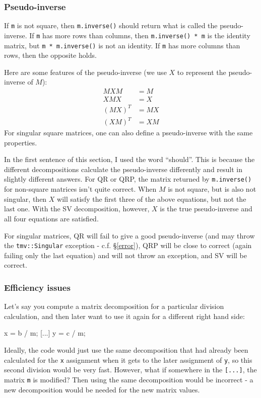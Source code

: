 \documentclass[twoside,letterpaper,11pt]{article}
\renewcommand{\tt}[1]{{\lstinline {#1}}}
\begin{document}
\subsubsection{Pseudo-inverse}
\label{pseudoinverse}

If \tt{m} is not square, then \tt{m.inverse()} should return what is called the pseudo-inverse.
If \tt{m} has more rows than columns, then \tt{m.inverse() * m} is the identity matrix, 
but \tt{m * m.inverse()}
is not an identity.  If \tt{m} has more columns than rows, then the opposite holds.

Here are some features of the pseudo-inverse (we use $X$ to represent the pseudo-inverse
of $M$):
\begin{align*}
M X M &= M \\
X M X &= X \\
(M X)^T &= M X \\
(X M)^T &= X M 
\end{align*}
For singular square matrices, 
one can also define a pseudo-inverse with the same properties.

In the first sentence of this section, I used the word ``should''.  
This is because the different decompositions calculate the pseudo-inverse 
differently and result in slightly
different answers.  For QR or QRP, the matrix returned by \tt{m.inverse()} for
non-square matrices isn't
quite correct.  When $M$ is not square, but is also not singular, then $X$
will satisfy the first three of the above equations,
but not the last one.  With the SV decomposition, however,
$X$ is the true pseudo-inverse and all four equations are satisfied.

For singular matrices, QR will fail to give a good pseudo-inverse (and may throw the
\tt{tmv::Singular} exception - c.f. \S\ref{error}), QRP will be close to correct
(again failing only the last equation) and will not throw an exception, and SV will be correct.

\subsubsection{Efficiency issues}
\label{efficiency}

Let's say you compute a matrix decomposition for a particular division calculation, and
then later want to use it again for a different right hand side:
\begin{tmvcode}
x = b / m;
[...]
y = c / m;
\end{tmvcode}
Ideally, the code would just use the same decomposition that had already been calculated
for the \tt{x} assignment when it gets to the later assignment of \tt{y}, 
so this second division would be very fast.
However, what if somewhere in the \tt{[...]}, the matrix \tt{m} is modified?  
Then using
the same decomposition would be incorrect - a new decomposition would be needed
for the new matrix values.
\end{document}
